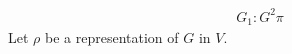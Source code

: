 \message{ !name(main.tex)}\documentclass{article}
\begin{document}

\begin{eqnarray}
  \label{eq:1}
  G_1 \colon G^{2} \pi  
\end{eqnarray}
Let $\rho$ be a representation of $G$ in $V$. 
\end{document}
